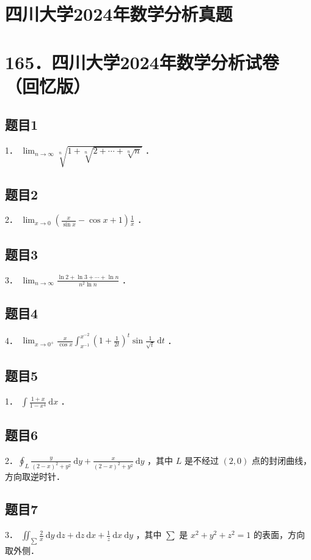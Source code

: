 \documentclass{article}
\begin{document}
\section*{四川大学2024年数学分析真题}
\section*{165．四川大学2024年数学分析试卷（回忆版）}

\subsection{题目1}
1． \(\lim _{n \rightarrow \infty} \sqrt[n]{1+\sqrt[n]{2+\cdots+\sqrt[n]{n}}}\) ．

\subsection{题目2}
2． \(\lim _{x \rightarrow 0}\left(\frac{x}{\sin x}-\cos x+1\right) \frac{1}{x}\) ．

\subsection{题目3}
3． \(\lim _{n \rightarrow \infty} \frac{\ln 2+\ln 3+\cdots+\ln n}{n^{2} \ln n}\) ．

\subsection{题目4}
4． \(\lim _{x \rightarrow 0^{+}} \frac{x}{\cos x} \int_{x^{-1}}^{x^{-2}}\left(1+\frac{1}{2 t}\right)^{t} \sin \frac{1}{\sqrt{t}} \mathrm{~d} t\) ．

\subsection{题目5}
1． \(\int \frac{1+x}{1-x^{4}} \mathrm{~d} x\) ．

\subsection{题目6}
2．\(\oint_{L} \frac{y}{(2-x)^{2}+y^{2}} \mathrm{~d} y+\frac{x}{(2-x)^{2}+y^{2}} \mathrm{~d} y\) ，其中 \(L\) 是不经过 \((2,0)\) 点的封闭曲线，方向取逆时针．

\subsection{题目7}
3． \(\iint_{\sum} \frac{2}{x} \mathrm{~d} y \mathrm{~d} z+\mathrm{d} z \mathrm{~d} x+\frac{1}{z} \mathrm{~d} x \mathrm{~d} y\) ，其中 \(\sum\) 是 \(x^{2}+y^{2}+z^{2}=1\) 的表面，方向取外侧．
\end{document}
